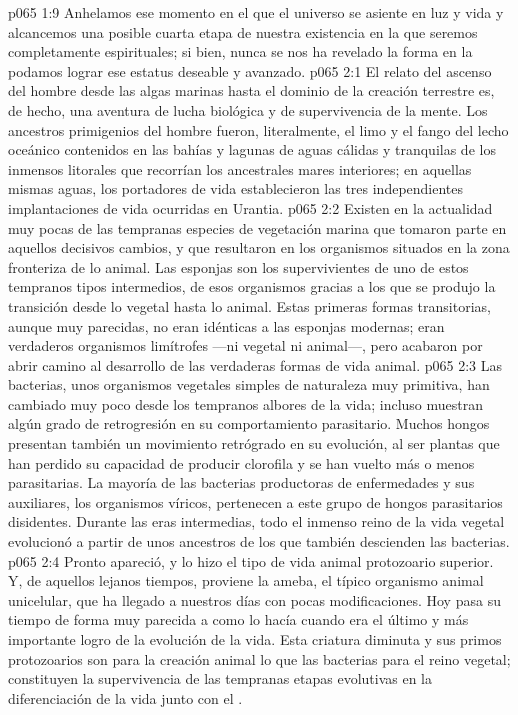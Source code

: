 \vs p065 1:9 Anhelamos ese momento en el que el universo se asiente en luz y vida y alcancemos una posible cuarta etapa de nuestra existencia en la que seremos completamente espirituales; si bien, nunca se nos ha revelado la forma en la podamos lograr ese estatus deseable y avanzado.
\vs p065 2:1 El relato del ascenso del hombre desde las algas marinas hasta el dominio de la creación terrestre es, de hecho, una aventura de lucha biológica y de supervivencia de la mente. Los ancestros primigenios del hombre fueron, literalmente, el limo y el fango del lecho oceánico contenidos en las bahías y lagunas de aguas cálidas y tranquilas de los inmensos litorales que recorrían los ancestrales mares interiores; en aquellas mismas aguas, los portadores de vida establecieron las tres independientes implantaciones de vida ocurridas en Urantia.
\vs p065 2:2 Existen en la actualidad muy pocas de las tempranas especies de vegetación marina que tomaron parte en aquellos decisivos cambios, y que resultaron en los organismos situados en la zona fronteriza de lo animal. Las esponjas son los supervivientes de uno de estos tempranos tipos intermedios, de esos organismos gracias a los que se produjo la transición  desde lo vegetal hasta lo animal. Estas primeras formas transitorias, aunque muy parecidas, no eran idénticas a las esponjas modernas; eran verdaderos organismos limítrofes ---ni vegetal ni animal---, pero acabaron por abrir camino al desarrollo de las verdaderas formas de vida animal.
\vs p065 2:3 Las bacterias, unos organismos vegetales simples de naturaleza muy primitiva, han cambiado muy poco desde los tempranos albores de la vida; incluso muestran algún grado de retrogresión en su comportamiento parasitario. Muchos hongos presentan también un movimiento retrógrado en su evolución, al ser plantas que han perdido su capacidad de producir clorofila y se han vuelto más o menos parasitarias. La mayoría de las bacterias productoras de enfermedades y sus auxiliares, los organismos víricos, pertenecen a este grupo de hongos parasitarios disidentes. Durante las eras intermedias, todo el inmenso reino de la vida vegetal evolucionó a partir de unos ancestros de los que también descienden las bacterias.
\vs p065 2:4 Pronto apareció, y lo hizo  el tipo de vida animal protozoario superior. Y, de aquellos lejanos tiempos, proviene la ameba, el típico organismo animal unicelular, que ha llegado a nuestros días con pocas modificaciones. Hoy pasa su tiempo de forma muy parecida a como lo hacía cuando era el último y más importante logro de la evolución de la vida. Esta criatura diminuta y sus primos protozoarios son para la creación animal lo que las bacterias para el reino vegetal; constituyen la supervivencia de las tempranas etapas evolutivas en la diferenciación de la vida junto con el .
